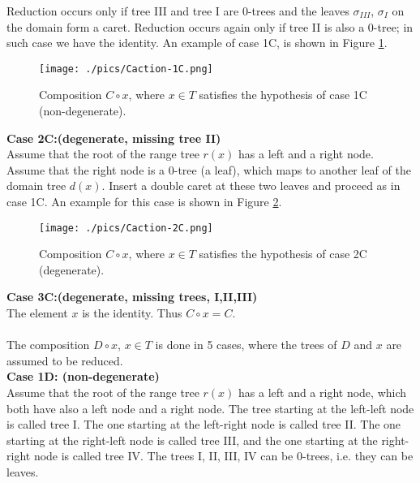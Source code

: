 \documentclass{amsart}
\theoremstyle{definition}
\begin{document}
Reduction occurs only if tree III and tree I are 0-trees and the leaves $\sigma_{III}$, $\sigma_{I}$ on the domain form a caret. Reduction occurs again only if tree II is also a 0-tree; in such case we have the identity.
An example of case 1C, is shown in Figure \ref{f:case1Cexample}.\\
\begin{figure}
\texttt{[image: ./pics/Caction-1C.png]}\\
  \caption{ Composition $C\circ x$, where $x\in T$ satisfies the hypothesis of case 1C (non-degenerate). 
  }\label{f:case1Cexample}
\end{figure}
%
\textbf{Case 2C:(degenerate, missing tree II)}\\
Assume that the root of the range tree $r(x)$ has a left and a right node. Assume that the right node is a 0-tree (a leaf), which maps to another leaf of the domain tree $d(x)$. Insert a double caret at these two leaves and proceed as in case 1C. An example for this case is shown in Figure \ref{f:case2Cexample}.\\
\begin{figure}
\texttt{[image: ./pics/Caction-2C.png]}\\
  \caption{ Composition $C\circ x$, where $x\in T$ satisfies the hypothesis of case 2C (degenerate). 
  }\label{f:case2Cexample}
\end{figure}
%
\textbf{Case 3C:(degenerate, missing trees, I,II,III)}\\
The element $x$ is the identity. Thus $C\circ x=C$.\\\\

The composition $D\circ x$, $x\in T$ is done in 5 cases, where the trees of $D$ and $x$ are assumed to be reduced.\\
%
\textbf{Case 1D: (non-degenerate)}\\
Assume that the root of the range tree $r(x)$ has a left and a right node, which both have also a left node and a right node.
The tree starting at the left-left node is called tree I. The one starting at the left-right node is called tree II. The one starting at the right-left node is called tree III, and the one starting at the right-right node is called tree IV. The trees I, II, III, IV can be 0-trees, i.e. they can be leaves.
\end{document}
